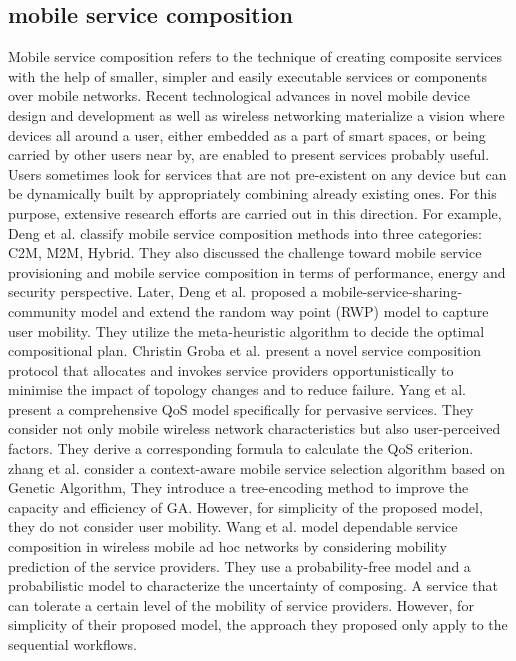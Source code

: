 \documentclass[10pt,journal,compsoc]{IEEEtran}
\begin{document}
\subsection{mobile service composition}
Mobile service composition refers to the technique of creating composite services with the help of smaller, simpler and easily executable services or components over mobile networks. Recent technological advances in novel mobile device design and development as well as wireless networking materialize a vision where devices all around a user, either embedded as a part of smart spaces, or being carried by other users
near by, are enabled to present services probably useful. Users sometimes look for services that are not pre-existent on any device but can be dynamically built by appropriately combining already existing ones. For this purpose, extensive research efforts are carried out in this direction. 
For example, Deng et al. \cite{Deng2016} classify mobile service composition methods into three categories: C2M, M2M, Hybrid. They also discussed the challenge toward mobile service provisioning and mobile service composition in terms of performance, energy and security perspective. 
Later, Deng et al. \cite{Deng2017} proposed a mobile-service-sharing-community model and extend the random way point (RWP) model to capture user mobility. They utilize the meta-heuristic algorithm to decide the optimal compositional plan. 
Christin Groba et al. \cite{groba2014opportunistic} present a novel service composition protocol that allocates and invokes service providers opportunistically to minimise the impact of topology changes and to reduce failure.
Yang et al. \cite{Yang2010} present a comprehensive QoS model specifically for pervasive services. They consider not only mobile wireless network characteristics but also user-perceived factors. They derive a corresponding formula to calculate the QoS criterion.
zhang et al. \cite{Zhang2016qos} consider a context-aware mobile service selection algorithm based on Genetic Algorithm, They introduce a tree-encoding method to improve the capacity and efficiency of GA. However, for simplicity of the proposed model, they do not consider user mobility.
Wang et al. \cite{wang2011exploiting} model dependable service composition in wireless mobile ad hoc networks by considering mobility prediction of the service providers.
They use a probability-free model and a probabilistic model to characterize the uncertainty of composing. A service that can tolerate a certain level of the mobility of service providers. However, for simplicity of their proposed model, the approach they proposed only apply to the sequential workflows.
\end{document}
